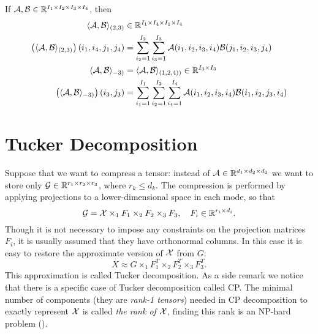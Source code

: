 If $\mathcal{A}, \mathcal{B} \in \mathbb{R}^{I_1 \times I_2 \times I_3 \times I_4}$, then
\begin{eqnarray*}
\begin{split}
\langle \mathcal{A}, \mathcal{B} \rangle_{(2,3)} & \in \mathbb{R}^{I_1 \times I_4 \times I_1 \times I_4} \\
\left( \langle \mathcal{A}, \mathcal{B} \rangle_{(2,3)}\right)(i_1, i_4, j_1, j_4) &= \sum_{i_2 = 1}^{I_2} \sum_{i_3 = 1}^{I_3} \mathcal{A}(i_1, i_2, i_3, i_4) \mathcal{B}(j_1, i_2, i_3, j_4) \\
\langle \mathcal{A}, \mathcal{B} \rangle_{-3)} &= \langle \mathcal{A}, \mathcal{B} \rangle_{(1,2,4))} \in \mathbb{R}^{I_3 \times I_3} \\
\left( \langle \mathcal{A}, \mathcal{B} \rangle_{-3)}\right)(i_3, j_3) &= \sum_{i_1 =1 }^{I_1} \sum_{i_2 = 1}^{I_2} \sum_{i_4 = 1}^{I_4} \mathcal{A}(i_1, i_2, i_3, i_4) \mathcal{B}(i_1, i_2, j_3, i_4) 
\end{split}
\end{eqnarray*}


\section{Tucker Decomposition}


Suppose that we want to compress a tensor: instead of $\mathcal{A} \in \mathbb{R}^{d_1 \times d_2 \times d_3}$
we want to store only $\mathcal{G} \in \mathbb{R}^{r_1 \times r_2 \times r_3}$, where $r_k \leq d_k$.
The compression is performed by applying projections to a lower-dimensional
space in each mode, so that
\begin{equation}
    \mathcal{G} = \mathcal{X} \times_1 F_1 \times_2 F_2 \times_3 F_3, \quad F_i \in \mathbb{R}^{r_i \times d_i}.
\end{equation}
Though it  is not necessary to impose any constraints on the  projection matrices $F_i$,
it is usually assumed that they have orthonormal columns. In this case it is
easy to restore the approximate version of $\mathcal{X}$ from $G$:
\begin{equation}
    X \approx G \times _{1} F_1^T \times _{2} F_2^T \times _{3} F_3^T.
\end{equation}
This approximation is called Tucker decomposition. 
As a side remark we notice that there is a specific case of Tucker decomposition
called CP. The minimal number of components (they are \textit{rank-1 tensors}) needed
in CP decomposition to exactly represent $\mathcal{X}$ is called \textit{the rank of $\mathcal{X}$},
finding this rank is an NP-hard problem (\cite{}).



